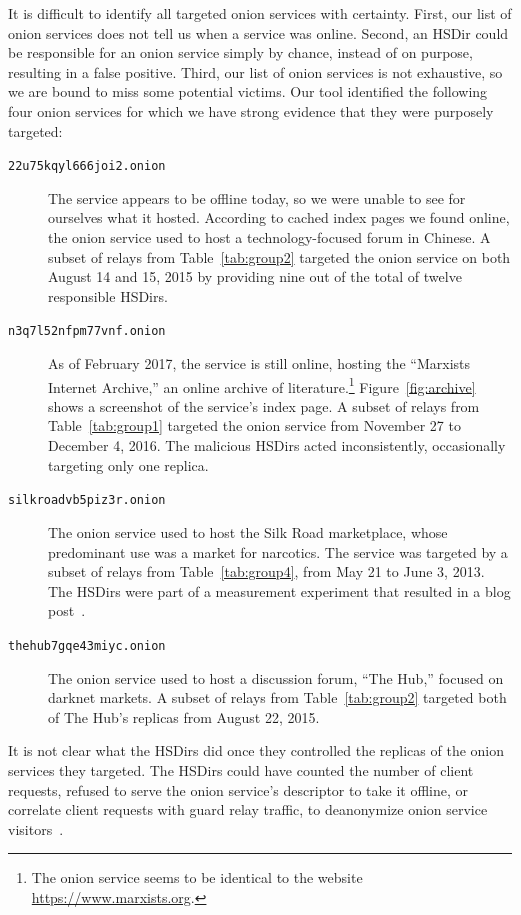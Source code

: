 It is difficult to identify all targeted onion services with certainty.  First,
our list of onion services does not tell us when a service was online.  Second,
an HSDir could be responsible for an onion service simply by chance, instead of
on purpose, resulting in a false positive.  Third, our list of onion services is
not exhaustive, so we are bound to miss some potential victims.  Our tool
identified the following four onion services for which we have strong evidence
that they were purposely targeted:

\begin{description}
	\item[\texttt{22u75kqyl666joi2.onion}] The service appears to be offline
		today, so we were unable to see for ourselves what it hosted.  According
		to cached index pages we found online, the onion service used to host a
		technology-focused forum in Chinese.  A subset of relays from
		Table~\ref{tab:group2} targeted the onion service on both August 14 and
		15, 2015 by providing nine out of the total of twelve responsible
		HSDirs.

	\item[\texttt{n3q7l52nfpm77vnf.onion}] As of February 2017, the service is
		still online, hosting the ``Marxists Internet Archive,'' an online
		archive of literature.\footnote{The onion service seems to be identical
		to the website \url{https://www.marxists.org}.} Figure~\ref{fig:archive}
		shows a screenshot of the service's index page.  A subset of relays from
		Table~\ref{tab:group1} targeted the onion service from November 27 to
		December 4, 2016.  The malicious HSDirs acted inconsistently,
		occasionally targeting only one replica.

	\item[\texttt{silkroadvb5piz3r.onion}] The onion service used to host the
		Silk Road marketplace, whose predominant use was a market for narcotics.
		The service was targeted by a subset of relays from
		Table~\ref{tab:group4}, from May 21 to June 3, 2013.  The HSDirs were
		part of a measurement experiment that resulted in a blog
		post~\cite{OCearbhaill2013a}.

	\item[\texttt{thehub7gqe43miyc.onion}] The onion service used to host a
		discussion forum, ``The Hub,'' focused on darknet markets.  A subset of
		relays from Table~\ref{tab:group2} targeted both of The Hub's replicas
		from August 22, 2015.
\end{description}

It is not clear what the HSDirs did once they controlled the replicas
of the onion services they targeted.  The HSDirs could have counted the number
of client requests, refused to serve the onion service's descriptor to take it
offline, or correlate client requests with guard relay traffic, to deanonymize
onion service visitors~\cite{Dingledine2014a}.

